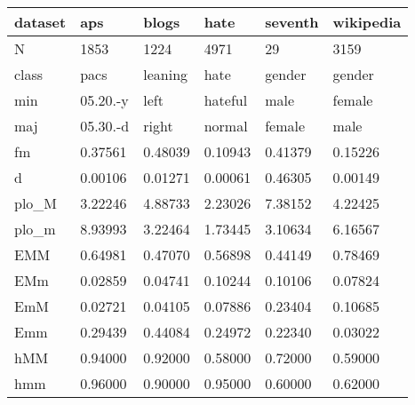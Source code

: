 \begin{tabular}{llllll}
\toprule
dataset &       aps &    blogs &     hate & seventh & wikipedia \\
\midrule
N     &      1853 &     1224 &     4971 &      29 &      3159 \\
class &      pacs &  leaning &     hate &  gender &    gender \\
min   &  05.20.-y &     left &  hateful &    male &    female \\
maj   &  05.30.-d &    right &   normal &  female &      male \\
fm    &   0.37561 &  0.48039 &  0.10943 & 0.41379 &   0.15226 \\
d     &   0.00106 &  0.01271 &  0.00061 & 0.46305 &   0.00149 \\
plo\_M &   3.22246 &  4.88733 &  2.23026 & 7.38152 &   4.22425 \\
plo\_m &   8.93993 &  3.22464 &  1.73445 & 3.10634 &   6.16567 \\
EMM   &   0.64981 &  0.47070 &  0.56898 & 0.44149 &   0.78469 \\
EMm   &   0.02859 &  0.04741 &  0.10244 & 0.10106 &   0.07824 \\
EmM   &   0.02721 &  0.04105 &  0.07886 & 0.23404 &   0.10685 \\
Emm   &   0.29439 &  0.44084 &  0.24972 & 0.22340 &   0.03022 \\
hMM   &   0.94000 &  0.92000 &  0.58000 & 0.72000 &   0.59000 \\
hmm   &   0.96000 &  0.90000 &  0.95000 & 0.60000 &   0.62000 \\
\bottomrule
\end{tabular}
